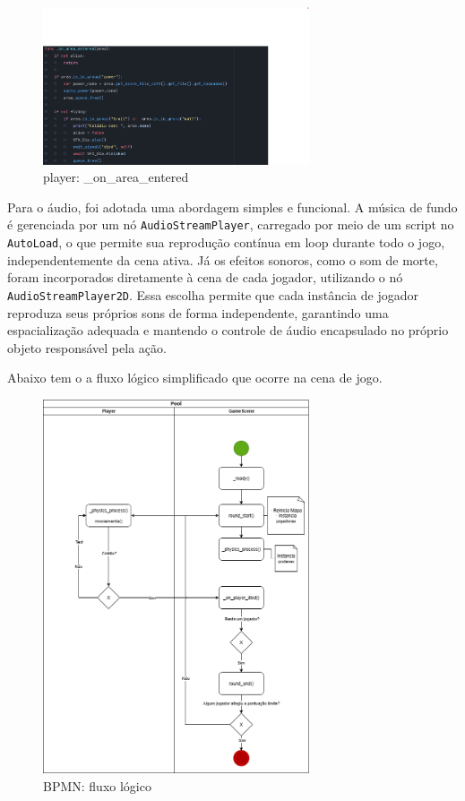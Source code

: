 \begin{figure}[htbp]
    \centering
    \caption{player: \_on\_area\_entered}
    \label{fig:player_area_func}
    \includegraphics[width=0.7\textwidth]{figuras/player_body.png}
\end{figure}

Para o áudio, foi adotada uma abordagem simples e funcional. A música de fundo é gerenciada por um nó \texttt{AudioStreamPlayer}, carregado por meio de um script no \texttt{AutoLoad}, o que permite sua reprodução contínua em loop durante todo o jogo, independentemente da cena ativa. Já os efeitos sonoros, como o som de morte, foram incorporados diretamente à cena de cada jogador, utilizando o nó \texttt{AudioStreamPlayer2D}. Essa escolha permite que cada instância de jogador reproduza seus próprios sons de forma independente, garantindo uma espacialização adequada e mantendo o controle de áudio encapsulado no próprio objeto responsável pela ação.

Abaixo tem o a fluxo lógico simplificado que ocorre na cena de jogo.

\begin{figure}[htbp]
    \centering
    \caption{BPMN: fluxo lógico}
    \label{fig:bpmn}
    \includegraphics[width=0.7\textwidth]{figuras/BPMN_tcc.png}
\end{figure}

